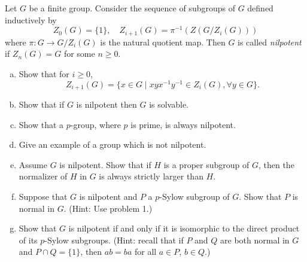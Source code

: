 \documentclass{article}
\newcounter{Problem}
\newenvironment{Problem}{\begin{Exercise}[name={Problem},
                                          counter={Problem}]}
                        {\end{Exercise}}
\begin{document}
\begin{Problem}
Let $G$ be a finite group. Consider the sequence of subgroups of $G$
defined inductively by
$$
Z_0(G) = \{ 1 \}, \quad
Z_{i+1}(G) = \pi^{-1}(Z(G/Z_i(G)))
$$
where $\pi : G \to G / Z_i(G)$ is the natural quotient map. Then $G$
is called \emph{nilpotent} if $Z_n(G) = G$ for some $n \geq 0$.

\begin{enumerate}[(a)]
  \item{
    Show that for $i \geq 0$,
    $$
    Z_{i+1}(G) = \{ x \in G
                   \mid
                   xyx^{-1}y^{-1} \in Z_i(G), \forall y \in G
                \}.
    $$
  }
  \item{
    Show that if $G$ is nilpotent then $G$ is solvable.
  }
  \item{
    Show that a $p$-group, where $p$ is prime, is always nilpotent.
  }
  \item{
    Give an example of a group which is not nilpotent.
  }
  \item{
    Assume $G$ is nilpotent. Show that if $H$ is a proper subgroup of $G$, then
    the normalizer of $H$ in $G$ is always strictly larger than $H$.
  }
  \item{
    Suppose that $G$ is nilpotent and $P$ a $p$-Sylow subgroup of
    $G$. Show that $P$ is normal in $G$. (Hint: Use problem 1.)
  }
  \item{
    Show that $G$ is nilpotent if and only if it is isomorphic to the
    direct product of its $p$-Sylow subgroups. (Hint: recall that if
    $P$ and $Q$ are both normal in $G$ and $P \cap Q = \{ 1 \}$, then
    $ab = ba$ for all $a \in P$, $b \in Q$.)
  }
\end{enumerate}
\end{Problem}
\end{document}
